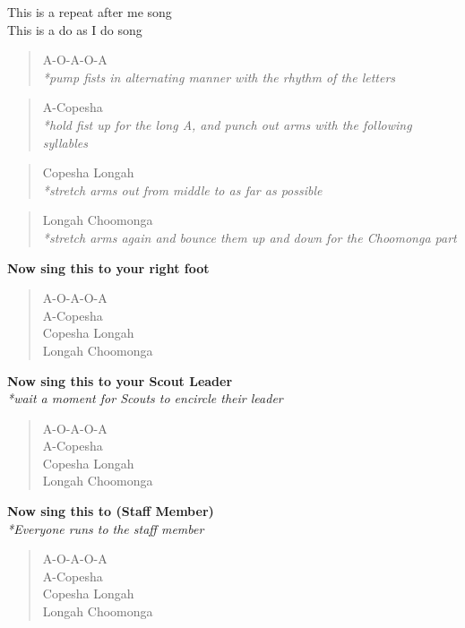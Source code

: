 
This is a repeat after me song \\
This is a do as I do song

\begin{verse}
A-O-A-O-A \\
\textit{*pump fists in alternating manner with the rhythm of the letters} \\
\end{verse}

\begin{verse}
A-Copesha \\
\textit{*hold fist up for the long A, and punch out arms with the following syllables} \\
\end{verse}

\begin{verse}
Copesha Longah \\
\textit{*stretch arms out from middle to as far as possible} \\
\end{verse}

\begin{verse}
Longah Choomonga \\
\textit{*stretch arms again and bounce them up and down for the Choomonga part} \\
\end{verse}

\textbf{Now sing this to your right foot}

\begin{verse}
A-O-A-O-A \\

A-Copesha \\

Copesha Longah \\

Longah Choomonga \\
\end{verse}

\textbf{Now sing this to your Scout Leader} \\
\textit{*wait a moment for Scouts to encircle their leader}

\begin{verse}
A-O-A-O-A \\

A-Copesha \\

Copesha Longah \\

Longah Choomonga \\
\end{verse}

\textbf{Now sing this to (Staff Member)} \\
\textit{*Everyone runs to the staff member}

\begin{verse}
A-O-A-O-A \\

A-Copesha \\

Copesha Longah \\

Longah Choomonga \\
\end{verse}
